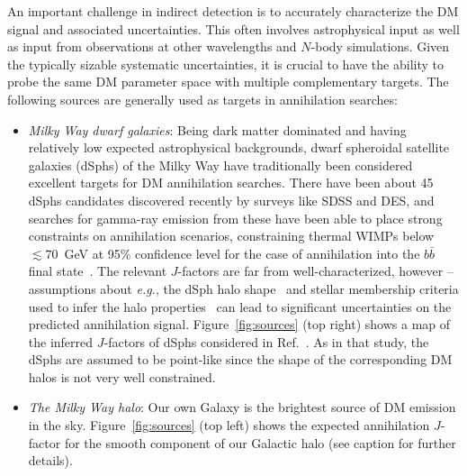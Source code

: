 An important challenge in indirect detection is to accurately characterize the DM signal and associated uncertainties. This often involves astrophysical input as well as input from observations at other wavelengths and $N$-body simulations. Given the typically sizable systematic uncertainties, it is crucial to have the ability to probe the same DM parameter space with multiple complementary targets. The following sources are generally used as targets in annihilation searches:  %
\begin{itemize}
\item \emph{Milky Way dwarf galaxies}: Being dark matter dominated and having relatively low expected astrophysical backgrounds, dwarf spheroidal satellite galaxies (dSphs) of the Milky Way have traditionally been considered excellent targets for DM annihilation searches. There have been about 45 dSphs candidates discovered recently by surveys like SDSS and DES, and searches for gamma-ray emission from these have been able to place strong constraints on annihilation scenarios, constraining thermal WIMPs below $\lesssim 70$~GeV at 95\% confidence level for the case of annihilation into  the $b\bar b$ final state~\cite{Fermi-LAT:2016uux,Ackermann:2015zua}. The relevant $J$-factors are far from well-characterized, however -- assumptions about \emph{e.g.}, the dSph halo shape~\cite{Geringer-Sameth:2014qqa,Sanders:2016eie} and stellar membership criteria used to infer the halo properties~\cite{2016MNRAS.462..223B,Geringer-Sameth:2014yza} can lead to significant uncertainties on the predicted annihilation signal. Figure~\ref{fig:sources} (top right) shows a map of the inferred $J$-factors of dSphs considered in Ref.~\cite{Fermi-LAT:2016uux}. As in that study, the dSphs are assumed to be point-like since the shape of the corresponding DM halos is not very well constrained.
\item \emph{The Milky Way halo}: Our own Galaxy is the brightest source of DM emission in the sky. Figure~\ref{fig:sources} (top left) shows the expected annihilation $J$-factor for the smooth component of our Galactic halo (see caption for further details). 


\end{itemize}
